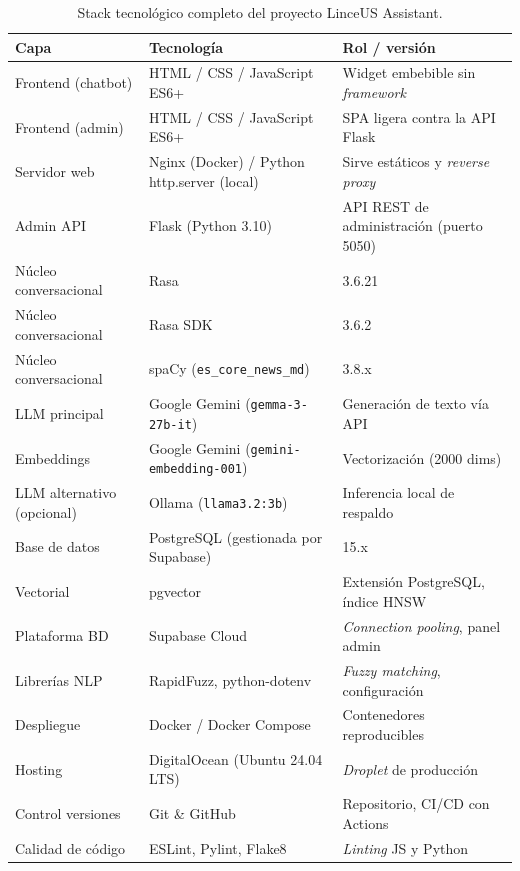 \begin{table}[h]
\centering
\small
\begin{tabular}{|p{3cm}|p{4.6cm}|p{5cm}|}
\hline
\textbf{Capa} & \textbf{Tecnología} & \textbf{Rol / versión} \\ \hline
Frontend (chatbot) & HTML / CSS / JavaScript ES6+ & Widget embebible sin \textit{framework} \\ \hline
Frontend (admin)   & HTML / CSS / JavaScript ES6+ & SPA ligera contra la API Flask \\ \hline
Servidor web      & Nginx (Docker) / Python http.server (local) & Sirve estáticos y \textit{reverse proxy} \\ \hline
Admin API         & Flask (Python 3.10) & API REST de administración (puerto 5050) \\ \hline
Núcleo conversacional & Rasa & 3.6.21 \\ \hline
Núcleo conversacional & Rasa SDK & 3.6.2 \\ \hline
Núcleo conversacional & spaCy (\texttt{es\_core\_news\_md}) & 3.8.x \\ \hline
LLM principal     & Google Gemini (\texttt{gemma-3-27b-it}) & Generación de texto vía API \\ \hline
Embeddings        & Google Gemini (\texttt{gemini-embedding-001}) & Vectorización (2000 dims) \\ \hline
LLM alternativo (opcional) & Ollama (\texttt{llama3.2:3b}) & Inferencia local de respaldo \\ \hline
Base de datos     & PostgreSQL (gestionada por Supabase) & 15.x \\ \hline
Vectorial         & pgvector & Extensión PostgreSQL, índice HNSW \\ \hline
Plataforma BD     & Supabase Cloud & \textit{Connection pooling}, panel admin \\ \hline
Librerías NLP     & RapidFuzz, python-dotenv & \textit{Fuzzy matching}, configuración \\ \hline
Despliegue        & Docker / Docker Compose & Contenedores reproducibles \\ \hline
Hosting           & DigitalOcean (Ubuntu 24.04 LTS) & \textit{Droplet} de producción \\ \hline
Control versiones & Git \& GitHub & Repositorio, CI/CD con Actions \\ \hline
Calidad de código & ESLint, Pylint, Flake8 & \textit{Linting} JS y Python \\ \hline
\end{tabular}
\caption{Stack tecnológico completo del proyecto LinceUS Assistant.}
\label{tab:stack-tecnologico}
\end{table}

